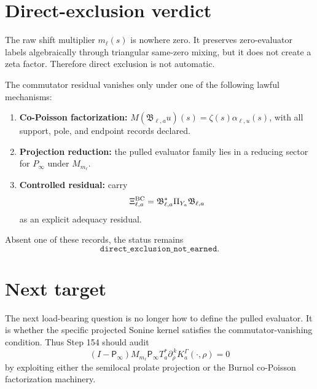 \documentclass[11pt]{article}
\begin{document}
\section{Direct-exclusion verdict}
The raw shift multiplier \(m_\ell(s)\) is nowhere zero. It preserves zero-evaluator labels algebraically through triangular same-zero mixing, but it does not create a zeta factor. Therefore direct exclusion is not automatic.

The commutator residual vanishes only under one of the following lawful mechanisms:
\begin{enumerate}
  \item \textbf{Co-Poisson factorization:} \(M(\mathfrak B_{\ell,a}u)(s)=\zeta(s)\alpha_{\ell,u}(s)\), with all support, pole, and endpoint records declared.
  \item \textbf{Projection reduction:} the pulled evaluator family lies in a reducing sector for \(P_\infty\) under \(M_{m_\ell}\).
  \item \textbf{Controlled residual:} carry
  \[
    \Xi^{\rm BC}_{\ell,a}=\mathfrak B_{\ell,a}^*\Pi_{Y_a}\mathfrak B_{\ell,a}
  \]
  as an explicit adequacy residual.
\end{enumerate}

Absent one of these records, the status remains
\[
  \boxed{\texttt{direct\_exclusion\_not\_earned}.}
\]

\section{Next target}
The next load-bearing question is no longer how to define the pulled evaluator. It is whether the specific projected Sonine kernel satisfies the commutator-vanishing condition. Thus Step 154 should audit
\[
  (I-\mathsf P_\infty)M_{m_\ell}\mathsf P_\infty
  T_a^*\partial_{\overline \rho}^{\,k}K_a^\Gamma(\cdot,\rho)
  = 0
\]
by exploiting either the semilocal prolate projection or the Burnol co-Poisson factorization machinery.
\end{document}
